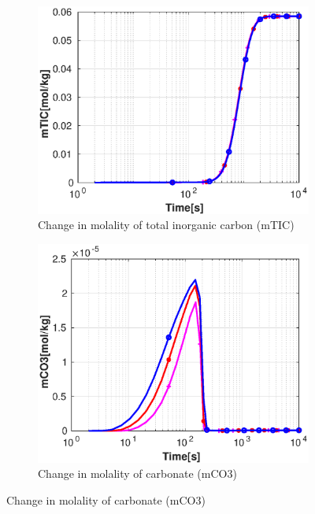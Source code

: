 \begin{figure}[!h]
\begin{subfigure}{.5\linewidth}
    \end{subfigure}%
        \hfill
        \begin{subfigure}{.5\linewidth}
            \centering
        \includegraphics[width=\textwidth]{PICTURES/with_grid_mTIC.eps}
        \caption{\small Change in molality of total inorganic carbon (mTIC)}
        \label{fig:gridmTIC}
    \end{subfigure}%
        \hfill
        \begin{subfigure}{.5\linewidth}
            \centering
        \includegraphics[width=\textwidth]{PICTURES/with_grid_mCO3.eps}
        \caption{\small Change in molality of carbonate (mCO3)}

\end{subfigure}
\end{figure}
